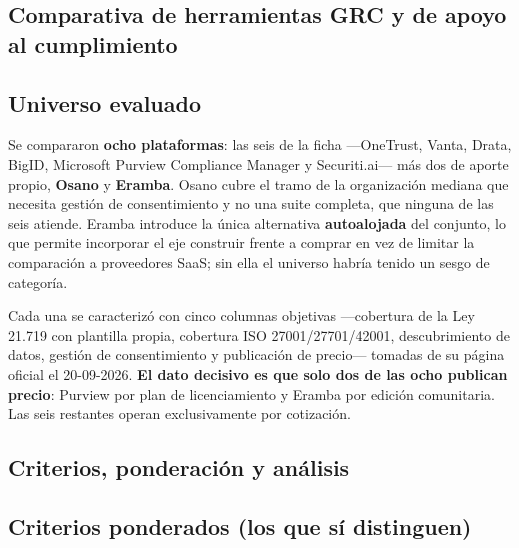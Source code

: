 \subsection{Comparativa de herramientas GRC y de apoyo al cumplimiento}\label{comparativa-de-herramientas-grc-y-de-apoyo-al-cumplimiento}

\subsection{Universo evaluado}\label{universo-evaluado}

Se compararon \textbf{ocho plataformas}: las seis de la ficha ---OneTrust, Vanta, Drata, BigID, Microsoft Purview Compliance Manager y Securiti.ai--- más dos de aporte propio, \textbf{Osano} y \textbf{Eramba}. Osano cubre el tramo de la organización mediana que necesita gestión de consentimiento y no una suite completa, que ninguna de las seis atiende. Eramba introduce la única alternativa \textbf{autoalojada} del conjunto, lo que permite incorporar el eje construir frente a comprar en vez de limitar la comparación a proveedores SaaS; sin ella el universo habría tenido un sesgo de categoría.

Cada una se caracterizó con cinco columnas objetivas ---cobertura de la Ley 21.719 con plantilla propia, cobertura ISO 27001/27701/42001, descubrimiento de datos, gestión de consentimiento y publicación de precio--- tomadas de su página oficial el 20-09-2026. \textbf{El dato decisivo es que solo dos de las ocho publican precio}: Purview por plan de licenciamiento y Eramba por edición comunitaria. Las seis restantes operan exclusivamente por cotización.

\subsection{Criterios, ponderación y análisis}\label{criterios-ponderaciuxf3n-y-anuxe1lisis}

\subsection{Criterios ponderados (los que sí distinguen)}\label{criterios-ponderados-los-que-suxed-distinguen}

